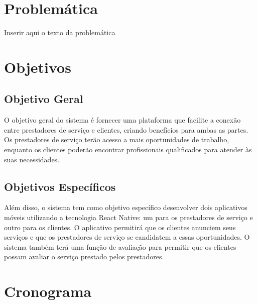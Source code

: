 \section{Problemática}

Inserir aqui o texto da problemática

\section{Objetivos}



\subsection{Objetivo Geral}
O objetivo geral do sistema é fornecer uma plataforma que facilite a conexão entre prestadores de serviço e clientes, 
criando benefícios para ambas as partes. Os prestadores de serviço terão acesso a mais oportunidades de trabalho, 
enquanto os clientes poderão encontrar profissionais qualificados para atender às suas necessidades.

\subsection{Objetivos Específicos}

Além disso, o sistema tem como objetivo específico desenvolver dois aplicativos móveis utilizando a tecnologia React Native: um para os prestadores de serviço e outro para os clientes. O aplicativo permitirá que os clientes anunciem seus serviços e que os prestadores de serviço se candidatem a essas oportunidades. O sistema também terá uma função de avaliação para permitir que os clientes possam avaliar o serviço prestado pelos prestadores.

\section{Cronograma}


